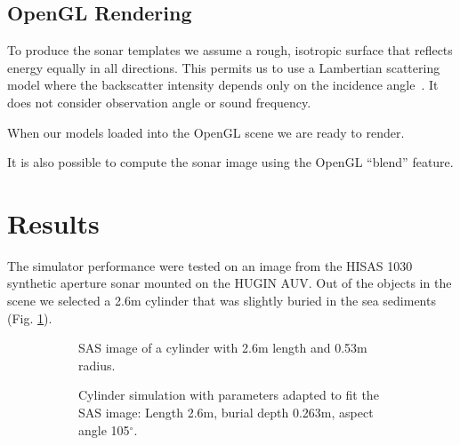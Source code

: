 \documentclass[
   UAM                                          %
 , 12pt                                         %
 , bibtex                                       %
 , layout
]{common/mytemplate}
\begin{document}
\subsection{OpenGL Rendering}

To produce the sonar templates we assume a rough, isotropic surface that reflects energy equally in all directions. This permits us to use a Lambertian scattering model where the backscatter intensity depends only on the incidence angle~\cite{Zhang1999}. It does not consider observation angle or sound frequency.   

When our models loaded into the OpenGL scene we are ready to render. 



It is also possible to compute the sonar image using the OpenGL ``blend'' feature.


\newpage

\section{Results}

\newlength\imgspacing\setlength\imgspacing{.5cm}

The simulator performance were tested on an image from the HISAS 1030 synthetic aperture sonar mounted on the HUGIN AUV. Out of the objects in the scene we selected a 2.6\;m cylinder that was slightly buried in the sea sediments (Fig. \ref{data_sylinder}). 


\begin{figure}[tp]\centering%
\begin{subfigure}[t]{.5\linewidth-\imgspacing/2}
%
\caption{SAS image of a cylinder with 2.6\;m length and 0.53\;m radius.}\label{data_sylinder}%
\end{subfigure}
\begin{subfigure}[t]{.5\linewidth-\imgspacing/2}
%
\caption{Cylinder simulation with parameters adapted to fit the SAS image: Length 2.6\;m, burial depth 0.263\;m, aspect angle 105$^\circ$.}%
\end{subfigure}
\caption{}
\end{figure}

\setcounter{topnumber}{2}
\end{document}
